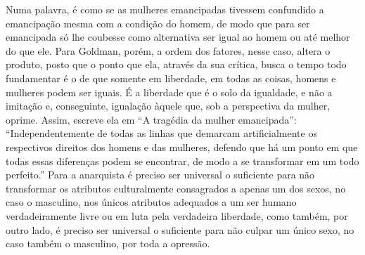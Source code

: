Numa palavra, é como se as mulheres emancipadas tivessem
confundido a emancipação mesma com a condição do homem, de modo que para
ser emancipada só lhe coubesse como alternativa ser igual ao homem ou
até melhor do que ele. Para Goldman, porém, a ordem dos fatores, nesse
caso, altera o produto, posto que o ponto que ela, através da sua
crítica, busca o tempo todo fundamentar é o de que somente em liberdade,
em todas as coisas, homens e mulheres podem ser iguais. É a liberdade
que é o solo da igualdade, e não a imitação e, conseguinte, igualação
àquele que, sob a perspectiva da mulher, oprime. Assim, escreve ela em
``A tragédia da mulher emancipada'': ``Independentemente de todas as
linhas que demarcam artificialmente os respectivos direitos dos homens e
das mulheres, defendo que há um ponto em que todas essas diferenças
podem se encontrar, de modo a se transformar em um todo perfeito.'' Para
a anarquista é preciso ser universal o suficiente para não transformar
os atributos culturalmente consagrados a apenas um dos sexos, no caso o
masculino, nos únicos atributos adequados a um ser humano
verdadeiramente livre ou em luta pela verdadeira liberdade, como também,
por outro lado, é preciso ser universal o suficiente para não culpar um
único sexo, no caso também o masculino, por toda a opressão.


